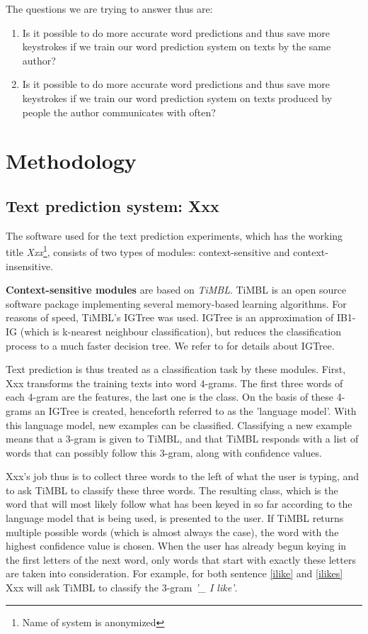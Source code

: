 \documentclass[11pt]{article}
\begin{document}
The questions we are trying to answer thus are:

\begin{enumerate}
\item Is it possible to do more accurate word predictions and thus save more keystrokes if we train our word prediction system on texts by the same author?
\item Is it possible to do more accurate word predictions and thus save more keystrokes if we train our word prediction system on texts produced by people the author communicates with often?
\end{enumerate}

\section{Methodology}

\subsection{Text prediction system: Xxx}

The software used for the text prediction experiments, which has the working title \emph{Xxx}\footnote{Name of system is anonymized}, consists of two types of modules: context-sensitive and context-insensitive. 

\textbf{Context-sensitive modules} are based on \emph{TiMBL}. TiMBL is an open source software package implementing several memory-based learning algorithms. For reasons of speed, TiMBL's IGTree was used. IGTree is an approximation of IB1-IG (which is k-nearest neighbour classification), but reduces the classification process to a much faster decision tree. We refer to  for details about IGTree.

Text prediction is thus treated as a classification task by these modules. First, Xxx transforms the training texts into word 4-grams. The first three words of each 4-gram are the features, the last one is the class. On the basis of these 4-grams an IGTree is created, henceforth referred to as the 'language model'. With this language model, new examples can be classified. Classifying a new example means that a 3-gram is given to TiMBL, and that TiMBL responds with a list of words that can possibly follow this 3-gram, along with confidence values. 

Xxx's job thus is to collect three words to the left of what the user is typing, and to ask TiMBL to classify these three words. The resulting class, which is the word that will most likely follow what has been keyed in so far according to the language model that is being used, is presented to the user. If TiMBL returns multiple possible words (which is almost always the case), the word with the highest confidence value is chosen. When the user has already begun keying in the first letters of the next word, only words that start with exactly these letters are taken into consideration. For example, for both sentence \ref{ilike} and \ref{ilikes} Xxx will ask TiMBL to classify the 3-gram \emph{'\_ I like'}.
\end{document}
